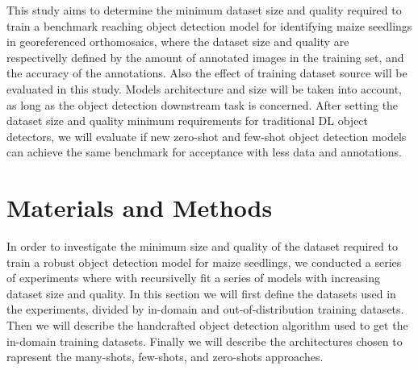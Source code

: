 \documentclass[journal,article,submit,pdftex,moreauthors]{Definitions/mdpi}
\begin{document}
This study aims to determine the minimum dataset size and quality required to train 
a benchmark reaching object detection model for identifying maize seedlings in georeferenced orthomosaics,
where the dataset size and quality are respectivelly defined by the amount of annotated 
images in the training set, and the accuracy of the annotations.
Also the effect of training dataset source will be evaluated in this study.
Models architecture and size will be taken into account, as long as the object detection
downstream task is concerned. 
After setting the dataset size and quality minimum requirements for traditional 
DL object detectors, we will evaluate if new zero-shot and few-shot object detection
models can achieve the same benchmark for acceptance with less data and annotations.

\section{Materials and Methods}




In order to investigate the minimum size and quality of the dataset required to train 
a robust object detection model for maize seedlings, we conducted a series of experiments
where with recursivelly fit a series of models with increasing dataset size and quality.
In this section we will first define the datasets used in the experiments, divided by 
in-domain and out-of-distribution training datasets. 
Then we will describe the handcrafted object detection algorithm used to get the 
in-domain training datasets.
Finally we will describe the architectures chosen to rapresent the 
many-shots, few-shots, and zero-shots approaches.
\end{document}
